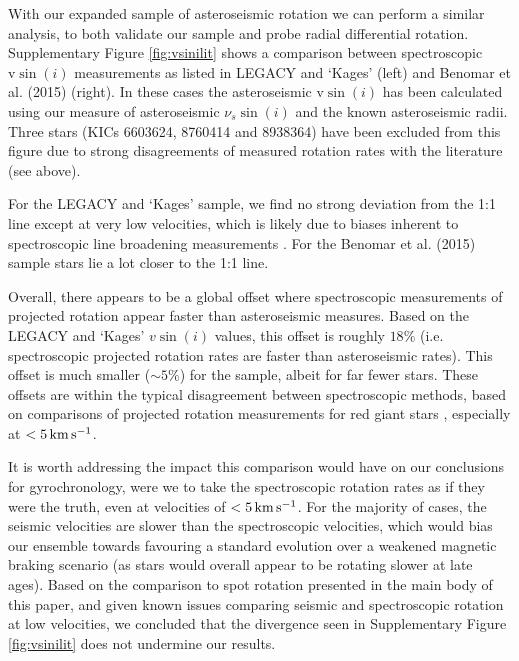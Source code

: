 With our expanded sample of asteroseismic rotation we can perform a similar analysis, to both validate our sample and probe radial differential rotation.  Supplementary Figure \ref{fig:vsinilit} shows a comparison between spectroscopic $\textrm{v}\sin(i)$ measurements as listed in LEGACY and `Kages' (left) and Benomar et al. (2015) \cite{benomar+2015} (right). In these cases the asteroseismic $\textrm{v}\sin(i)$ has been calculated using our measure of asteroseismic $\nu_s\sin(i)$ and the known asteroseismic radii. Three stars (KICs 6603624, 8760414 and 8938364) have been excluded from this figure due to strong disagreements of measured rotation rates with the literature (see above).

For the LEGACY and `Kages' sample, we find no strong deviation from the 1:1 line except at very low velocities, which is likely due to biases inherent to spectroscopic line broadening measurements \cite{doyle+2014, tayar+2015}. For the Benomar et al. (2015) sample stars lie a lot closer to the 1:1 line.

Overall, there appears to be a global offset where spectroscopic measurements of projected rotation appear faster than asteroseismic measures. Based on the LEGACY and `Kages' $v\sin(i)$ values, this offset is roughly $18\%$ (i.e. spectroscopic projected rotation rates are faster than asteroseismic rates). This offset is much smaller ($\sim5\%$) for the \cite{benomar+2015} sample, albeit for far fewer stars. These offsets are within the typical disagreement between spectroscopic methods, based on comparisons of projected rotation measurements for red giant stars \cite[see Figure 2]{tayar+2015}, especially at $< 5\, \rm{km\,s^{-1}}$.

It is worth addressing the impact this comparison would have on our conclusions for gyrochronology, were we to take the spectroscopic rotation rates as if they were the truth, even at velocities of $< 5\, \rm{km\,s^{-1}}$. For the majority of cases, the seismic velocities are slower than the spectroscopic velocities, which would bias our ensemble towards favouring a standard evolution over a weakened magnetic braking scenario (as stars would overall appear to be rotating slower at late ages). Based on the comparison to spot rotation presented in the main body of this paper, and given known issues comparing seismic and spectroscopic rotation at low velocities, we concluded that the divergence seen in  Supplementary Figure \ref{fig:vsinilit} does not undermine our results.


